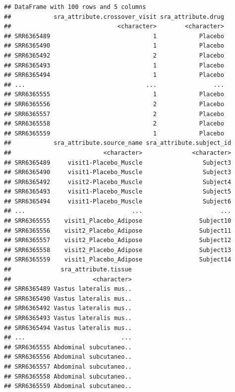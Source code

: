 \documentclass[
  spanish,
  11pt,
]{article}
\begin{document}
\begin{verbatim}
## DataFrame with 100 rows and 5 columns
##            sra_attribute.crossover_visit sra_attribute.drug
##                              <character>        <character>
## SRR6365489                             1            Placebo
## SRR6365490                             1            Placebo
## SRR6365492                             2            Placebo
## SRR6365493                             1            Placebo
## SRR6365494                             1            Placebo
## ...                                  ...                ...
## SRR6365555                             1            Placebo
## SRR6365556                             2            Placebo
## SRR6365557                             2            Placebo
## SRR6365558                             2            Placebo
## SRR6365559                             1            Placebo
##            sra_attribute.source_name sra_attribute.subject_id
##                          <character>              <character>
## SRR6365489     visit1-Placebo_Muscle                 Subject3
## SRR6365490     visit1-Placebo_Muscle                 Subject3
## SRR6365492     visit2-Placebo_Muscle                 Subject4
## SRR6365493     visit1-Placebo_Muscle                 Subject5
## SRR6365494     visit1-Placebo_Muscle                 Subject6
## ...                              ...                      ...
## SRR6365555    visit1_Placebo_Adipose                Subject10
## SRR6365556    visit2_Placebo_Adipose                Subject11
## SRR6365557    visit2_Placebo_Adipose                Subject12
## SRR6365558    visit2_Placebo_Adipose                Subject13
## SRR6365559    visit1_Placebo_Adipose                Subject14
##              sra_attribute.tissue
##                       <character>
## SRR6365489 Vastus lateralis mus..
## SRR6365490 Vastus lateralis mus..
## SRR6365492 Vastus lateralis mus..
## SRR6365493 Vastus lateralis mus..
## SRR6365494 Vastus lateralis mus..
## ...                           ...
## SRR6365555 Abdominal subcutaneo..
## SRR6365556 Abdominal subcutaneo..
## SRR6365557 Abdominal subcutaneo..
## SRR6365558 Abdominal subcutaneo..
## SRR6365559 Abdominal subcutaneo..
\end{verbatim}
\end{document}
